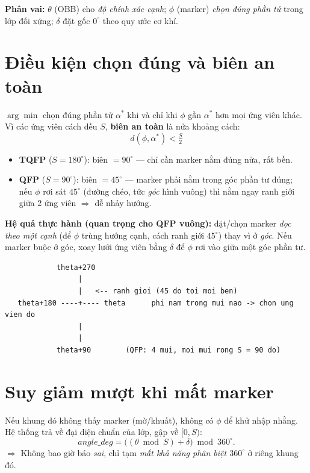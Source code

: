 \documentclass[12pt,a4paper]{article}
\begin{document}
\noindent\textbf{Phân vai:}
$\theta$ (OBB) cho \emph{độ chính xác cạnh}; $\phi$ (marker) \emph{chọn đúng phần tử} trong
lớp đối xứng; $\delta$ đặt gốc $0^\circ$ theo quy ước cơ khí.

\section{Điều kiện chọn đúng và biên an toàn}

$\arg\min$ chọn đúng phần tử $\alpha^\ast$ khi và chỉ khi $\phi$ gần $\alpha^\ast$ hơn mọi
ứng viên khác. Vì các ứng viên cách đều $S$, \textbf{biên an toàn} là nửa khoảng cách:
\[
\boxed{\; d(\phi, \alpha^\ast) < \tfrac{S}{2} \;}
\]
\begin{itemize}[leftmargin=1.4em]
  \item \textbf{TQFP} ($S=180^\circ$): biên $=90^\circ$ --- chỉ cần marker nằm đúng nửa, rất bền.
  \item \textbf{QFP} ($S=90^\circ$): biên $=45^\circ$ --- marker phải nằm trong góc phần tư
        đúng; nếu $\phi$ rơi sát $45^\circ$ (đường chéo, tức \emph{góc} hình vuông) thì nằm
        ngay ranh giới giữa 2 ứng viên $\Rightarrow$ dễ nhảy hướng.
\end{itemize}

\noindent\textbf{Hệ quả thực hành (quan trọng cho QFP vuông):} đặt/chọn marker
\emph{dọc theo một cạnh} (để $\phi$ trùng hướng cạnh, cách ranh giới $45^\circ$) thay vì ở
\emph{góc}. Nếu marker buộc ở góc, xoay lưới ứng viên bằng $\delta$ để $\phi$ rơi vào giữa
một góc phần tư.

\begin{verbatim}
            theta+270
                 |
                 |   <-- ranh gioi (45 do toi moi ben)
   theta+180 ----+---- theta      phi nam trong mui nao -> chon ung vien do
                 |
                 |
            theta+90        (QFP: 4 mui, moi mui rong S = 90 do)
\end{verbatim}

\section{Suy giảm mượt khi mất marker}

Nếu khung đó không thấy marker (mờ/khuất), không có $\phi$ để khử nhập nhằng. Hệ thống trả
về đại diện chuẩn của lớp, gập về $[0,S)$:
\[
angle\_deg = \bigl((\theta \bmod S) + \delta\bigr) \bmod 360^\circ.
\]
$\Rightarrow$ Không bao giờ báo \emph{sai}, chỉ tạm \emph{mất khả năng phân biệt $360^\circ$}
ở riêng khung đó.
\end{document}
